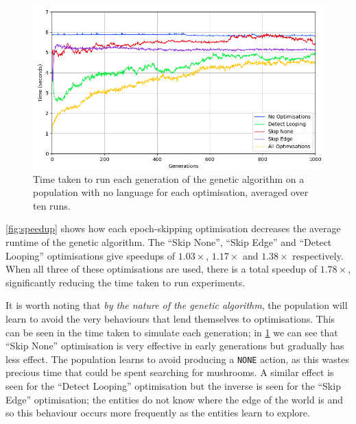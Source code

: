 \documentclass[12pt,a4paper]{report}
\begin{document}
\begin{figure}[t]
  \centering
  \captionsetup{width=.9\linewidth}
  \includegraphics[width=.9\linewidth]{figs/generation-time2}
  \caption{Time taken to run each generation of the genetic algorithm on a population with no language for each optimisation, averaged over ten runs.}
  \label{fig:generation-time}
\end{figure}

\cref{fig:speedup} shows how each epoch-skipping optimisation decreases the average runtime of the genetic algorithm. The ``Skip None'', ``Skip Edge'' and ``Detect Looping'' optimisations give speedups of $1.03\times$, $1.17\times$ and $1.38\times$ respectively. When all three of these optimisations are used, there is a total speedup of $1.78\times$, significantly reducing the time taken to run experiments.


It is worth noting that \emph{by the nature of the genetic algorithm}, the population will learn to avoid the very behaviours that lend themselves to optimisations. This can be seen in the time taken to simulate each generation; in \cref{fig:generation-time} we can see that ``Skip None'' optimisation is very effective in early generations but gradually has less effect. The population learns to avoid producing a \texttt{NONE} action, as this wastes precious time that could be spent searching for mushrooms. A similar effect is seen for the ``Detect Looping'' optimisation but the inverse is seen for the ``Skip Edge'' optimisation; the entities do not know where the edge of the world is and so this behaviour occurs more frequently as the entities learn to explore.
\end{document}

